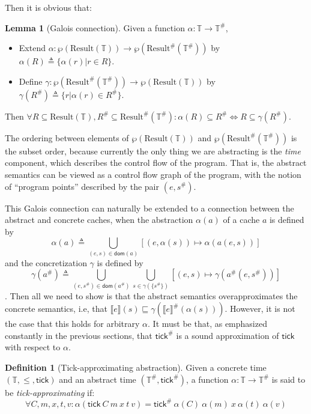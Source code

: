 \documentclass[acmsmall,review]{acmart}\settopmatter{printfolios=true,printccs=false,printacmref=false}
\theoremstyle{definition}
\newtheorem{definition}{Definition}[section]
\newtheorem{lem}{Lemma}[section]
\newcommand*{\A}[1]{{#1}^{\#}}
\newcommand*{\Time}{\mathbb{T}}
\newcommand*{\ATime}{\A{\Time}}
\newcommand*{\mem}{m}
\newcommand*{\Result}[1]{\text{Result}({#1})}
\newcommand*{\AResult}[1]{\A{\text{Result}}({#1})}
\newcommand*{\sembracket}[1]{\lBrack{#1}\rBrack}
\newcommand*{\tick}{\mathsf{tick}}
\begin{document}
Then it is obvious that:
\begin{lem}[Galois connection]
  Given a function $\alpha:\Time\rightarrow\ATime$,
  \begin{itemize}
    \item Extend ${\alpha}:\wp(\Result{\Time})\rightarrow\wp(\AResult{\ATime})$ by ${\alpha}(R)\triangleq\{\alpha(r)|r\in R\}$.
    \item Define ${\gamma}:\wp(\AResult{\ATime})\rightarrow\wp(\Result{\Time})$ by ${\gamma}(\A{R})\triangleq\{r|\alpha(r)\in\A{R}\}$.
  \end{itemize}
  Then $\forall R\subseteq\Result{\Time},\A{R}\subseteq\AResult{\ATime}:{\alpha}(R)\subseteq\A{R}\Leftrightarrow R\subseteq{\gamma}(\A{R})$.
\end{lem}

The ordering between elements of $\wp(\Result{\Time})$ and $\wp(\AResult{\ATime})$ is the subset order, because currently the only thing we are abstracting is the \emph{time} component, which describes the control flow of the program.
That is, the abstract semantics can be viewed as a control flow graph of the program, with the notion of ``program points'' described by the pair $(e,\A{s})$.

This Galois connection can naturally be extended to a connection between the abstract and concrete caches, when the abstraction $\alpha(a)$ of a cache $a$ is defined by
\[\alpha(a)\triangleq\bigcup_{(e,s)\in\mathsf{dom}(a)}[(e,\alpha(s))\mapsto\alpha(a(e,s))]\]
and the concretization $\gamma$ is defined by
\[\gamma(\A{a})\triangleq\bigcup_{(e,\A{s})\in\mathsf{dom}(\A{a})}\bigcup_{s\in\gamma(\{\A{s}\})}[(e,s)\mapsto\gamma(\A{a}(e,\A{s}))]\].
Then all we need to show is that the abstract semantics overapproximates the concrete semantics, i.e, that $\sembracket{e}(s)\sqsubseteq\gamma(\A{\sembracket{e}}(\alpha(s)))$.
However, it is not the case that this holds for arbitrary $\alpha$.
It must be that, as emphasized constantly in the previous sections, that $\A\tick$ is a sound approximation of $\tick$ with respect to $\alpha$.

\begin{definition}[Tick-approximating abstraction]
  Given a concrete time $(\Time,\le,\tick)$ and an abstract time $(\ATime, \A\tick)$, a function $\alpha:\Time\rightarrow\ATime$ is said to be \emph{tick-approximating} if:
  \[
    \forall C,\mem,x,t,v:\alpha(\tick\:C\:\mem\:x\:t\:v)=\A\tick\:\alpha(C)\:\alpha(\mem)\:x\:\alpha(t)\:\alpha(v)
  \]
\end{definition}
\end{document}
